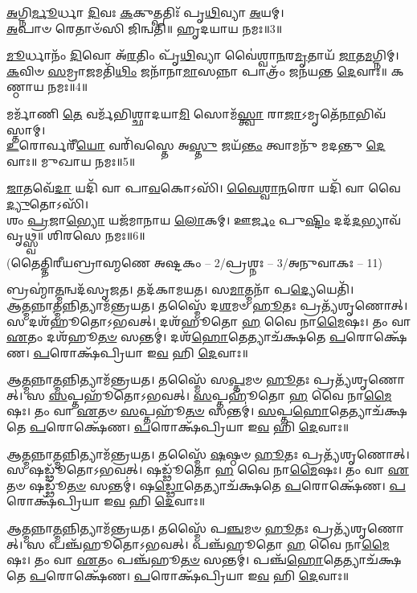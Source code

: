 \-\ul{𑌅}\-𑌗𑍍𑌨𑌿\-\ul{𑌰𑍍𑌮𑍂}\-𑌰𑍍𑌧𑌾 \ul{𑌦𑌿}\-𑌵𑌃 \ul{𑌕}\-𑌕𑍁𑌤𑍍𑌪𑌤𑌿𑌃᳴ 𑌪𑍃\-\ul{𑌥𑌿}\-𑌵𑍍𑌯𑌾 \ul{𑌅}\-𑌯𑌮𑍍।\\
 \ul{𑌅}\-𑌪𑌾𑍞 𑌰𑍇𑌤𑌾𑍞᳴𑌸𑌿 𑌜𑌿𑌨𑍍𑌵𑌤𑌿॥ 𑌹𑍃𑌦𑌯𑌾𑌯 𑌨𑌮𑌃॥3॥

\-\ul{𑌮𑍂}\-𑌰𑍍𑌧𑌾𑌨𑌂᳴ \ul{𑌦𑌿}\-𑌵𑍋 𑌅᳴\-\ul{𑌰}\-𑌤𑌿𑌂 𑌪𑍃᳴\-\ul{𑌥𑌿}\-𑌵𑍍𑌯𑌾 𑌵𑍈॑𑌶𑍍𑌵𑌾\-\ul{𑌨}\-𑌰\-\ul{𑌮𑍃}\-𑌤𑌾𑌯᳴ \ul{𑌜𑌾}\-𑌤\-\ul{𑌮}\-𑌗𑍍𑌨𑌿𑌮𑍍।\\
\-\ul{𑌕}\-𑌵𑌿𑍞 \ul{𑌸}\-𑌮𑍍𑌰𑌾\-\ul{𑌜}\-𑌮𑌤𑌿᳴\-\ul{𑌥𑌿𑌂} 𑌜𑌨𑌾᳴𑌨𑌾\-\ul{𑌮𑌾}\-𑌸𑌨𑍍𑌨𑌾 𑌪𑌾𑌤𑍍𑌰𑌂᳴ 𑌜𑌨𑌯𑌨𑍍𑌤 \ul{𑌦𑍇}\-𑌵𑌾𑌃॥ 𑌕𑌣𑍍𑌠𑌾𑌯 𑌨𑌮𑌃॥4॥

𑌮𑌰𑍍𑌮𑌾᳴𑌣𑌿 \ul{𑌤𑍇} 𑌵𑌰𑍍𑌮᳴𑌭𑌿𑌶𑍍𑌛𑌾𑌦𑌯𑌾\-\ul{𑌮𑌿} 𑌸𑍋𑌮᳴\-\ul{𑌸𑍍𑌤𑍍𑌵𑌾} 𑌰𑌾\-\ul{𑌜𑌾}\-𑌽𑌮𑍃𑌤𑍇᳴\-\ul{𑌨𑌾}\-𑌭𑌿\-𑌵᳴𑌸𑍍𑌤𑌾𑌮𑍍।\\
\-\ul{𑌉}\-𑌰𑍋𑌰𑍍𑌵𑌰𑍀᳴\-\ul{𑌯𑍋} 𑌵𑌰𑌿᳴𑌵𑌸𑍍𑌤𑍇 𑌅\-\ul{𑌸𑍍𑌤𑍁} 𑌜𑌯᳴\-\ul{𑌨𑍍𑌤𑌂} 𑌤𑍍𑌵𑌾𑌮𑌨𑍁᳴ 𑌮𑌦𑌨𑍍𑌤𑍁 \ul{𑌦𑍇}\-𑌵𑌾𑌃॥ 𑌮𑍁𑌖𑌾𑌯 𑌨𑌮𑌃॥5॥

\-\ul{𑌜𑌾}\-𑌤𑌵𑍇᳴\-\ul{𑌦𑌾} 𑌯𑌦𑌿᳴ 𑌵𑌾 𑌪𑌾\-\ul{𑌵}\-𑌕𑍋𑌽𑌸𑌿᳴। \ul{𑌵𑍈}\-\-\ul{𑌶𑍍𑌵𑌾}\-\-\ul{𑌨}\-𑌰𑍋 𑌯𑌦𑌿᳴ 𑌵𑌾 𑌵𑍈\-\ul{𑌦𑍍𑌯𑍁}\-𑌤𑍋𑌽𑌸𑌿᳴।\\
𑌶𑌂 \ul{𑌪𑍍𑌰}\-𑌜𑌾\-\ul{𑌭𑍍𑌯𑍋} 𑌯𑌜᳴𑌮𑌾𑌨𑌾𑌯 \ul{𑌲𑍋}\-𑌕𑌮𑍍। 𑌊\-\ul{𑌰𑍍𑌜𑌂} 𑌪𑍁\-\ul{𑌷𑍍𑌟𑌿𑌂} 𑌦𑌦᳴\-\ul{𑌦}\-𑌭𑍍𑌯𑌾𑌵᳴𑌵𑍃𑌥𑍍𑌸𑍍𑌵॥ 𑌶𑌿𑌰𑌸𑍇 𑌨𑌮𑌃॥6॥

{\small \closesection}

\centerline{\scriptsize (𑌤𑍈𑌤𑍍𑌤𑌿𑌰𑍀𑌯𑌬𑍍𑌰𑌾𑌹𑍍𑌮𑌣𑍇 𑌅𑌷𑍍𑌟𑌕𑌂 – 2/𑌪𑍍𑌰𑌶𑍍𑌨𑌃 – 3/𑌅𑌨𑍁𑌵𑌾𑌕𑌃 – 11)}

𑌬𑍍𑌰𑌹𑍍𑌮𑌾॑\-\ul{𑌤𑍍𑌮}\-𑌨𑍍𑌵𑌦᳴𑌸𑍃𑌜𑌤। 𑌤𑌦᳴𑌕𑌾𑌮𑌯𑌤। 𑌸\-\ul{𑌮𑌾}\-𑌤𑍍𑌮𑌨𑌾᳴ 𑌪\-\ul{𑌦𑍍𑌯𑍇}\-𑌯𑍇𑌤𑌿᳴।\\
𑌆\-\ul{𑌤𑍍𑌮}\-𑌨𑍍𑌨𑌾\-\ul{𑌤𑍍𑌮}\-𑌨𑍍𑌨𑌿𑌤𑍍𑌯𑌾𑌮᳴𑌨𑍍𑌤𑍍𑌰𑌯𑌤। 𑌤𑌸𑍍𑌮𑍈᳴ 𑌦\-\ul{𑌶}\-𑌮𑍞 \ul{𑌹𑍂}\-𑌤𑌃 𑌪𑍍𑌰𑌤𑍍𑌯᳴𑌶𑍃𑌣𑍋𑌤𑍍। 𑌸 𑌦𑌶᳴𑌹𑍂𑌤𑍋𑌽𑌭𑌵𑌤𑍍। 𑌦𑌶᳴𑌹𑍂𑌤𑍋 \ul{𑌹} 𑌵𑍈 𑌨𑌾\-\ul{𑌮𑍈}\-𑌷𑌃। 𑌤𑌂 𑌵𑌾 \ul{𑌏}\-𑌤𑌂 𑌦𑌶᳴𑌹𑍂\-\ul{𑌤}\-\-\ul{𑍞} 𑌸𑌨𑍍𑌤𑌮𑍍॑। 𑌦𑌶᳴\-\ul{𑌹𑍋}\-𑌤𑍇𑌤𑍍𑌯𑌾𑌚᳴𑌕𑍍𑌷𑌤𑍇 \ul{𑌪}\-𑌰𑍋𑌕𑍍𑌷𑍇᳴𑌣। \ul{𑌪}\-𑌰𑍋𑌕𑍍𑌷᳴𑌪𑍍𑌰𑌿𑌯𑌾 𑌇\-\ul{𑌵} 𑌹𑌿 \ul{𑌦𑍇}\-𑌵𑌾𑌃॥

𑌆\-\ul{𑌤𑍍𑌮}\-𑌨𑍍𑌨𑌾\-\ul{𑌤𑍍𑌮}\-𑌨𑍍𑌨𑌿𑌤𑍍𑌯𑌾𑌮᳴𑌨𑍍𑌤𑍍𑌰𑌯𑌤। 𑌤𑌸𑍍𑌮𑍈᳴ 𑌸\-\ul{𑌪𑍍𑌤}\-𑌮𑍞 \ul{𑌹𑍂}\-𑌤𑌃 𑌪𑍍𑌰𑌤𑍍𑌯᳴𑌶𑍃𑌣𑍋𑌤𑍍। 𑌸 \ul{𑌸}\-𑌪𑍍𑌤𑌹𑍂᳴𑌤𑍋𑌽𑌭𑌵𑌤𑍍। \ul{𑌸}\-𑌪𑍍𑌤𑌹𑍂᳴𑌤𑍋 \ul{𑌹} 𑌵𑍈 𑌨𑌾\-\ul{𑌮𑍈}\-𑌷𑌃। 𑌤𑌂 𑌵𑌾 \ul{𑌏}\-𑌤𑍞 \ul{𑌸}\-𑌪𑍍𑌤𑌹𑍂᳴\-\ul{𑌤}\-\-\ul{𑍞} 𑌸𑌨𑍍𑌤𑌮𑍍॑। \ul{𑌸}\-𑌪𑍍𑌤\-\ul{𑌹𑍋}\-𑌤𑍇𑌤𑍍𑌯𑌾𑌚᳴𑌕𑍍𑌷𑌤𑍇 \ul{𑌪}\-𑌰𑍋𑌕𑍍𑌷𑍇᳴𑌣। \ul{𑌪}\-𑌰𑍋𑌕𑍍𑌷᳴𑌪𑍍𑌰𑌿𑌯𑌾 𑌇\-\ul{𑌵} 𑌹𑌿 \ul{𑌦𑍇}\-𑌵𑌾𑌃॥

𑌆\-\ul{𑌤𑍍𑌮}\-𑌨𑍍𑌨𑌾\-\ul{𑌤𑍍𑌮}\-𑌨𑍍𑌨𑌿𑌤𑍍𑌯𑌾𑌮᳴𑌨𑍍𑌤𑍍𑌰𑌯𑌤। 𑌤𑌸𑍍𑌮𑍈᳴ \ul{𑌷}\-𑌷𑍍𑌠𑍞 \ul{𑌹𑍂}\-𑌤𑌃 𑌪𑍍𑌰𑌤𑍍𑌯᳴𑌶𑍃𑌣𑍋𑌤𑍍। 𑌸 𑌷𑌡𑍍𑌢𑍂᳴𑌤𑍋𑌽𑌭𑌵𑌤𑍍। 𑌷𑌡𑍍𑌢𑍂᳴𑌤𑍋 \ul{𑌹} 𑌵𑍈 𑌨𑌾\-\ul{𑌮𑍈}\-𑌷𑌃। 𑌤𑌂 𑌵𑌾 \ul{𑌏}\-𑌤𑍞 𑌷𑌡𑍍𑌢𑍂᳴\-\ul{𑌤}\-\-\ul{𑍞} 𑌸𑌨𑍍𑌤𑌮𑍍॑। 𑌷\-\ul{𑌡𑍍𑌢𑍋}\-𑌤𑍇𑌤𑍍𑌯𑌾𑌚᳴𑌕𑍍𑌷𑌤𑍇 \ul{𑌪}\-𑌰𑍋𑌕𑍍𑌷𑍇᳴𑌣। \ul{𑌪}\-𑌰𑍋𑌕𑍍𑌷᳴𑌪𑍍𑌰𑌿𑌯𑌾 𑌇\-\ul{𑌵} 𑌹𑌿 \ul{𑌦𑍇}\-𑌵𑌾𑌃॥

𑌆\-\ul{𑌤𑍍𑌮}\-𑌨𑍍𑌨𑌾\-\ul{𑌤𑍍𑌮}\-𑌨𑍍𑌨𑌿𑌤𑍍𑌯𑌾𑌮᳴𑌨𑍍𑌤𑍍𑌰𑌯𑌤। 𑌤𑌸𑍍𑌮𑍈᳴ 𑌪\-\ul{𑌞𑍍𑌚}\-𑌮𑍞 \ul{𑌹𑍂}\-𑌤𑌃 𑌪𑍍𑌰𑌤𑍍𑌯᳴𑌶𑍃𑌣𑍋𑌤𑍍। 𑌸 𑌪𑌞𑍍𑌚᳴𑌹𑍂𑌤𑍋𑌽𑌭𑌵𑌤𑍍। 𑌪𑌞𑍍𑌚᳴𑌹𑍂𑌤𑍋 \ul{𑌹} 𑌵𑍈 𑌨𑌾\-\ul{𑌮𑍈}\-𑌷𑌃। 𑌤𑌂 𑌵𑌾 \ul{𑌏}\-𑌤𑌂 𑌪𑌞𑍍𑌚᳴𑌹𑍂\-\ul{𑌤}\-\-\ul{𑍞} 𑌸𑌨𑍍𑌤𑌮𑍍॑। 𑌪𑌞𑍍𑌚᳴\-\ul{𑌹𑍋}\-𑌤𑍇𑌤𑍍𑌯𑌾𑌚᳴𑌕𑍍𑌷𑌤𑍇 \ul{𑌪}\-𑌰𑍋𑌕𑍍𑌷𑍇᳴𑌣। \ul{𑌪}\-𑌰𑍋𑌕𑍍𑌷᳴𑌪𑍍𑌰𑌿𑌯𑌾 𑌇\-\ul{𑌵} 𑌹𑌿 \ul{𑌦𑍇}\-𑌵𑌾𑌃॥

